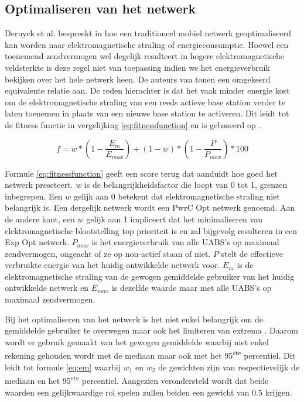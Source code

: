 \documentclass[twocolumn]{phdsymp_dutch}
\begin{document}
\subsection{Optimaliseren van het netwerk}

Deruyck et al. bespreekt in \cite{J1} hoe een traditioneel mobiel netwerk geoptimaliseerd kan worden naar elektromagnetische straling of energieconsumptie.
Hoewel een toenemend zendvermogen wel degelijk resulteert in hogere elektromagnetische veldsterkte is deze regel niet van 
toepassing indien we het energieverbruik bekijken over het hele netwerk heen. 
De auteurs van \cite{J1} tonen een omgekeerd equivalente relatie aan.
De reden hierachter is dat het vaak minder energie kost om de elektromagnetische straling van een reeds actieve base station 
verder te laten toenemen in plaats van  een nieuwe base station te activeren. Dit leidt tot de fitness functie 
in vergelijking \ref{eq:fitnessfunction} en is gebaseerd op \cite{J1}.

\begin{equation} 
f = w * \left(1 - \frac{E_m}{E_{max}}\right) + (1 - w)*\left(1 - \frac{P}{P_{max}}\right) * 100
\label{eq:fitnessfunction}
\end{equation}

Formule \ref{eq:fitnessfunction} geeft een score terug dat aanduidt hoe goed het netwerk preseteert.
$w$ is de belangrijkheidsfactor die loopt van 0 tot 1, grenzen inbegrepen. Een $w$ gelijk aan 0 betekent
dat elektromagnetische straling niet belangrijk is. Een dergelijk netwerk wordt een \gls{PwrC Opt} netwerk genoemd.
Aan de andere kant, een $w$ gelijk aan 1 impliceert dat het minimaliseren van elektromagnetische blootstelling top prioriteit is
en zal bijgevolg resulteren in een \gls{Exp Opt} netwerk. $P_{max}$ is het energieverbruik van alle \gls{UABS}'s op maximaal 
zendvermogen, ongeacht of ze 
op non-actief staan of niet.
$P$ stelt de effectieve verbruikte energie van het huidig ontwikkelde netwerk voor.
$E_m$ is de elektromagnetische straling van de gewogen gemiddelde gebruiker van het huidig ontwikkelde netwerk en 
$E_{max}$ is dezelfde waarde maar met alle \gls{UABS}'s op maximaal zendvermogen.

Bij het optimaliseren van het netwerk is het niet enkel belangrijk om  de gemiddelde gebruiker te overwegen maar ook het limiteren 
van extrema \cite{J1}. 
Daarom wordt er gebruik gemaakt van het gewogen gemiddelde waarbij niet enkel rekening gehouden wordt met de mediaan maar ook 
met het 95\textsuperscript{ste} percentiel. Dit leidt tot formule \ref{eq:em} waarbij 
  $w_1$ en  $w_2$ de gewichten zijn van respectievelijk de mediaan en het 95\textsuperscript{ste} percentiel.
 Aangezien verondersteld wordt dat beide waarden een gelijkwaardige rol spelen zullen beiden een gewicht van 0.5 krijgen. 
\end{document}
